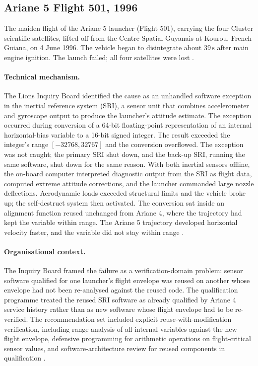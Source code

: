 \subsection{Ariane 5 Flight 501, 1996}

The maiden flight of the Ariane 5 launcher (Flight 501), carrying
the four Cluster scientific satellites, lifted off from the Centre
Spatial Guyanais at Kourou, French Guiana, on 4 June 1996. The
vehicle began to disintegrate about $39 \,\si{\second}$ after main
engine ignition. The launch failed; all four satellites were lost
\cite{acc:ariane501-ifr}.

\paragraph{Technical mechanism.} The Lions Inquiry Board identified
the cause as an unhandled software exception in the inertial
reference system (SRI), a sensor unit that combines accelerometer
and gyroscope output to produce the launcher's attitude estimate.
The exception occurred during conversion of a 64-bit floating-point
representation of an internal horizontal-bias variable to a 16-bit
signed integer. The result exceeded the integer's range
$[-32768, 32767]$ and the conversion overflowed. The exception was
not caught; the primary SRI shut down, and the back-up SRI, running
the same software, shut down for the same reason. With both
inertial sensors offline, the on-board computer interpreted
diagnostic output from the SRI as flight data, computed extreme
attitude corrections, and the launcher commanded large nozzle
deflections. Aerodynamic loads exceeded structural limits and the
vehicle broke up; the self-destruct system then activated. The
conversion sat inside an alignment function reused unchanged from
Ariane 4, where the trajectory had kept the variable within range.
The Ariane 5 trajectory developed horizontal velocity faster, and
the variable did not stay within range
\cite{acc:ariane501-ifr}.

\paragraph{Organisational context.} The Inquiry Board framed the
failure as a verification-domain problem: sensor software qualified
for one launcher's flight envelope was reused on another whose
envelope had not been re-analysed against the reused code. The
qualification programme treated the reused SRI software as already
qualified by Ariane 4 service history rather than as new software
whose flight envelope had to be re-verified. The recommendation set
included explicit reuse-with-modification verification, including
range analysis of all internal variables against the new flight
envelope, defensive programming for arithmetic operations on
flight-critical sensor values, and software-architecture review for
reused components in qualification \cite{acc:ariane501-ifr}.


